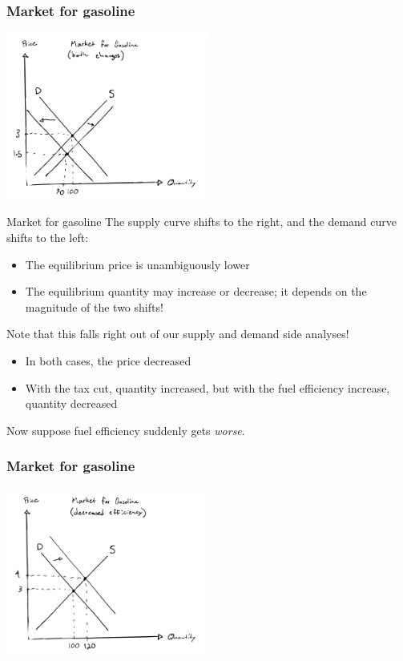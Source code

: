 \documentclass[aspectratio=169]{beamer}
\begin{document}
\begin{frame}
    \frametitle{Market for gasoline}
    \centering
    \includegraphics[width = 0.5\textwidth,keepaspectratio]{both_changes_1b.png}
\end{frame}

\begin{frame}{Market for gasoline}
    The supply curve shifts to the right, and the demand curve shifts to the left:
    \begin{itemize}
        \item The equilibrium price is unambiguously lower
        \item The equilibrium quantity may increase or decrease; it depends on the magnitude of the two shifts!
    \end{itemize}

    Note that this falls right out of our supply and demand side analyses!
    \begin{itemize}
        \item In both cases, the price decreased
        \item With the tax cut, quantity increased, but with the fuel efficiency increase, quantity decreased
    \end{itemize}

    Now suppose fuel efficiency suddenly gets \textit{worse}.

\end{frame}

\begin{frame}
    \frametitle{Market for gasoline}
    \centering
    \includegraphics[width = 0.5\textwidth,keepaspectratio]{decrease_efficiency.png}
\end{frame}
\end{document}
